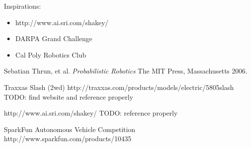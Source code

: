 Inspirations:
\begin{itemize}
\item http://www.ai.sri.com/shakey/
\item DARPA Grand Challenge
\item Cal Poly Robotics Club
\end{itemize}

\begin{thebibliography}{9}

   Sebatian Thrun, et al.
   \emph{Probabilistic Robotics}
   The MIT Press, Massachusetts
   2006.

   Traxxas Slash (2wd)
   http://traxxas.com/products/models/electric/5805slash
   TODO: find website and reference properly

   http://www.ai.sri.com/shakey/
   TODO: reference properly

   SparkFun Autonomous Vehicle Competition
   http://www.sparkfun.com/products/10435

\end{thebibliography}
